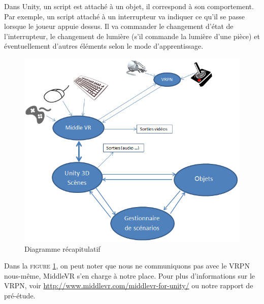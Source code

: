 Dans Unity, un script est attaché à un objet, il correspond à son comportement. Par exemple, un script attaché à un interrupteur va indiquer ce qu'il se passe lorsque le joueur appuie dessus. Il va commander le changement d'état de l'interrupteur, le changement de lumière (s'il commande la lumière d'une pièce) et éventuellement d'autres éléments selon le mode d'apprentissage.
\begin{figure}[h]
\centering
\includegraphics[width=1\textwidth]{4-Conception/img/recap.png}
\caption{ Diagramme récapitulatif }
\label{recap}
\end{figure}

Dans la \textsc{figure \ref{recap}}, on peut noter que nous ne communiquons pas avec le VRPN nous-même, MiddleVR s'en charge à notre place. Pour plus d'informations sur le VRPN, voir \url{http://www.middlevr.com/middlevr-for-unity/} ou notre rapport de pré-étude.
